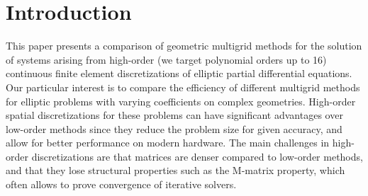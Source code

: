 \documentclass[times]{nlaauth}
\begin{document}
\date{}

\maketitle


\section{Introduction}

This paper presents a comparison of geometric multigrid
methods for the solution of systems arising from high-order (we target
polynomial orders up to 16) continuous finite element discretizations
of elliptic partial differential equations. Our particular interest is
to compare the efficiency of different multigrid methods for elliptic
problems with varying coefficients on complex geometries.
High-order spatial discretizations for these problems can have significant advantages
over low-order methods since they reduce the problem size for given
accuracy, and allow for better performance on modern hardware.
The main challenges in high-order discretizations are that matrices
are denser compared to low-order methods, and that they lose structural
properties such as the M-matrix
property, which often allows to prove convergence of iterative
solvers.
\end{document}

